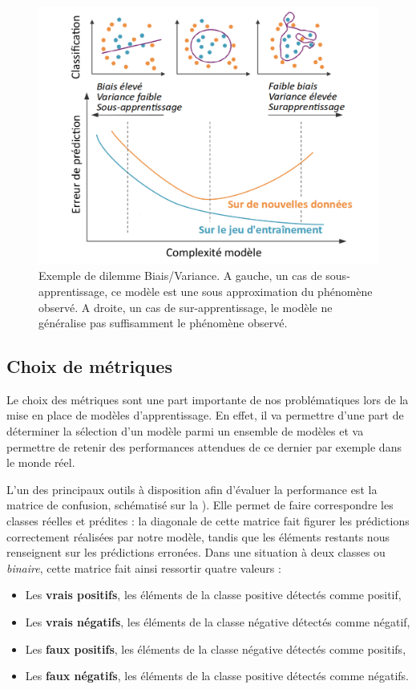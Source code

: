 \begin{figure}[H]
    \centering
    \includegraphics[width=0.8\linewidth]{contents/chapter_3/resources/example_underfit_overfit.pdf}
    \caption{Exemple de dilemme Biais/Variance. A gauche, un cas de sous-apprentissage, ce modèle est une sous approximation du phénomène observé. A droite, un cas de sur-apprentissage, le modèle ne généralise pas suffisamment le phénomène observé.}
    \label{fig:example_underfit_overfit}
\end{figure}

\subsection{Choix de métriques}
\label{subsec:metrics}
Le choix des métriques sont une part importante de nos problématiques lors de la mise en place de modèles d’apprentissage. En effet, il va permettre d'une part de déterminer la sélection d'un modèle parmi un ensemble de modèles et va permettre de retenir des performances attendues de ce dernier par exemple dans le monde réel.\par

L’un des principaux outils à disposition afin d'évaluer la performance est la matrice de confusion, schématisé sur la ). Elle permet de faire correspondre les classes réelles et prédites : la diagonale de cette matrice fait figurer les prédictions correctement réalisées par notre modèle, tandis que les éléments restants nous renseignent sur les prédictions erronées. Dans une situation à deux classes ou \textit{binaire}, cette matrice fait ainsi ressortir quatre valeurs :
\begin{itemize}
	\item Les \textbf{vrais positifs}, les éléments de la classe positive détectés comme positif,
	\item Les \textbf{vrais négatifs}, les éléments de la classe négative détectés comme négatif,
	\item Les \textbf{faux positifs}, les éléments de la classe négative détectés comme positifs,
	\item Les \textbf{faux négatifs}, les éléments de la classe positive détectés comme négatifs.
\end{itemize}\par

